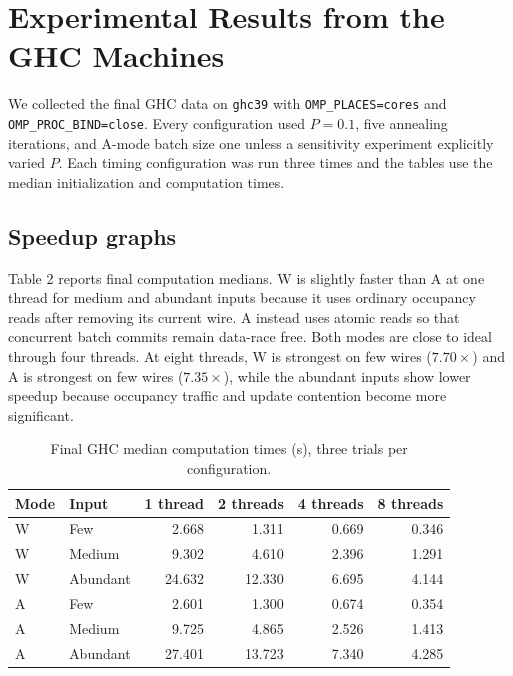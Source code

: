 \documentclass[11pt]{article}
\begin{document}
\clearpage
\section{Experimental Results from the GHC Machines}
\label{sec:ghc-final}

We collected the final GHC data on \texttt{ghc39} with \texttt{OMP\_PLACES=cores}
and \texttt{OMP\_PROC\_BIND=close}. Every configuration used $P=0.1$, five
annealing iterations, and A-mode batch size one unless a sensitivity experiment
explicitly varied $P$. Each timing configuration was run three times and the
tables use the median initialization and computation times.

\subsection{Speedup graphs}

Table 2 reports final computation medians. W is
slightly faster than A at one thread for medium and abundant inputs because it
uses ordinary occupancy reads after removing its current wire. A instead uses
atomic reads so that concurrent batch commits remain data-race free. Both modes
are close to ideal through four threads. At eight threads, W is strongest on
few wires ($7.70\times$) and A is strongest on few wires ($7.35\times$), while
the abundant inputs show lower speedup because occupancy traffic and update
contention become more significant.

\begin{table}[!htbp]
\centering
\small
\begin{tabular}{@{}llrrrr@{}}
\toprule
Mode & Input & 1 thread & 2 threads & 4 threads & 8 threads \\
\midrule
W & Few      & 2.668 & 1.311 & 0.669 & 0.346 \\
W & Medium   & 9.302 & 4.610 & 2.396 & 1.291 \\
W & Abundant & 24.632 & 12.330 & 6.695 & 4.144 \\
\midrule
A & Few      & 2.601 & 1.300 & 0.674 & 0.354 \\
A & Medium   & 9.725 & 4.865 & 2.526 & 1.413 \\
A & Abundant & 27.401 & 13.723 & 7.340 & 4.285 \\
\bottomrule
\end{tabular}
\caption{Final GHC median computation times (s), three trials per configuration.}
\label{tab:ghc-final-compute}
\end{table}
\end{document}
